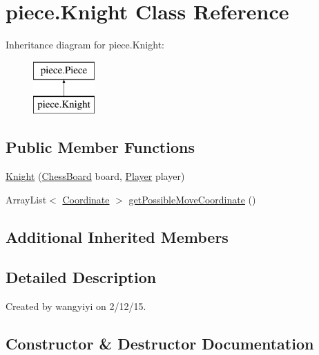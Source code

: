 \hypertarget{classpiece_1_1_knight}{}\section{piece.\+Knight Class Reference}
\label{classpiece_1_1_knight}
Inheritance diagram for piece.\+Knight\+:\begin{figure}[H]
\begin{center}
\leavevmode
\includegraphics[height=2.000000cm]{classpiece_1_1_knight}
\end{center}
\end{figure}
\subsection*{Public Member Functions}
\begin{DoxyCompactItemize}
\item 
\hyperlink{classpiece_1_1_knight_a74e148bd203ec7885971091cff1208ab}{Knight} (\hyperlink{classchessboard_1_1_chess_board}{Chess\+Board} board, \hyperlink{enumchessboard_1_1_player}{Player} player)
\item 
Array\+List$<$ \hyperlink{classpiece_1_1_coordinate}{Coordinate} $>$ \hyperlink{classpiece_1_1_knight_a1ac2e811908e6261d7e90bb5bed071c6}{get\+Possible\+Move\+Coordinate} ()
\end{DoxyCompactItemize}
\subsection*{Additional Inherited Members}


\subsection{Detailed Description}
Created by wangyiyi on 2/12/15. 

\subsection{Constructor \& Destructor Documentation}
\hypertarget{classpiece_1_1_knight_a74e148bd203ec7885971091cff1208ab}{}
